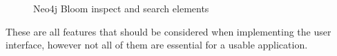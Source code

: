 \begin{figure}[H]%
    \centering
    \qquad
    \caption{Neo4j Bloom inspect and search elements}
\end{figure}
These are all features that should be considered when implementing the user interface, however not all of them are essential for a usable application.
